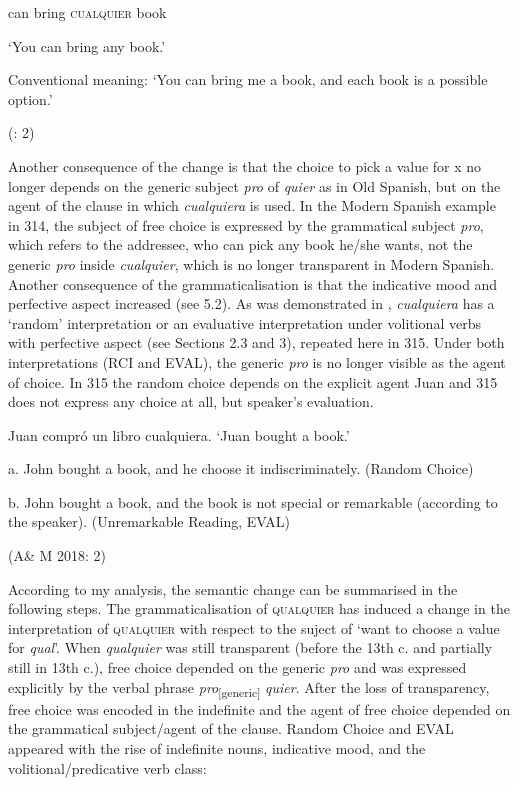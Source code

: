 \documentclass[output=paper]{langscibook}
\begin{document}
  can  bring  \textsc{cualquier}  book    

  ‘You can bring any book.’

  Conventional meaning: ‘You can bring me a book, and each book is a possible option.’

  (\citealt{AloniEtAl2011}: 2)

Another consequence of the change is that the choice to pick a value for x no longer depends on the generic subject \textit{pro} of \textit{quier} as in Old Spanish, but on the agent of the clause in which \textit{cualquiera} is used. In the Modern Spanish example in 314, the subject of free choice is expressed by the grammatical subject \textit{pro}, which refers to the addressee, who can pick any book he/she wants, not the generic \textit{pro} inside \textit{cualquier}, which is no longer transparent in Modern Spanish. Another consequence of the grammaticalisation is that the indicative mood and perfective aspect increased (see 5.2). As was demonstrated in , \textit{cualquiera} has a ‘random’ interpretation or an evaluative interpretation under volitional verbs with perfective aspect (see Sections 2.3 and 3), repeated here in 315. Under both interpretations (RCI and EVAL), the generic \textit{pro} is no longer visible as the agent of choice. In 315 the random choice depends on the explicit agent Juan and 315 does not express any choice at all, but speaker’s evaluation.

  Juan compró un libro cualquiera. ‘Juan bought a book.’

  a.  John bought a book, and he choose it indiscriminately. (Random Choice)

  b.  John bought a book, and the book is not special or remarkable (according to the speaker). (Unremarkable Reading, EVAL)

    (A\& M 2018: 2)

According to my analysis, the semantic change can be summarised in the following steps. The grammaticalisation of \textsc{qualquier} has induced a change in the interpretation of \textsc{qualquier} with respect to the suject of ‘want to choose a value for \textit{qual}’. When \textit{qualquier} was still transparent (before the 13th c. and partially still in 13th c.), free choice depended on the generic \textit{pro} and was expressed explicitly by the verbal phrase \textit{pro}\textsubscript{[generic]} \textit{quier}. After the loss of transparency, free choice was encoded in the indefinite and the agent of free choice depended on the grammatical subject/agent of the clause. Random Choice and EVAL appeared with the rise of indefinite nouns, indicative mood, and the volitional/predicative verb class:
\end{document}
